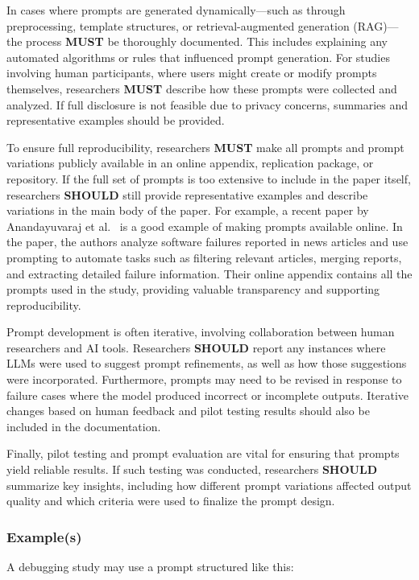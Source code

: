 \documentclass[11pt]{article}
\begin{document}
In cases where prompts are generated dynamically—such as through preprocessing, template structures, or retrieval-augmented generation (RAG)—the process \textbf{MUST} be thoroughly documented. This includes explaining any automated algorithms or rules that influenced prompt generation. For studies involving human participants, where users might create or modify prompts themselves, researchers \textbf{MUST} describe how these prompts were collected and analyzed. If full disclosure is not feasible due to privacy concerns, summaries and representative examples should be provided.

To ensure full reproducibility, researchers \textbf{MUST} make all prompts and prompt variations publicly available in an online appendix, replication package, or repository. If the full set of prompts is too extensive to include in the paper itself, researchers \textbf{SHOULD} still provide representative examples and describe variations in the main body of the paper. For example, a recent paper by Anandayuvaraj et al.~\cite{anandayuvaraj2024fail} is a good example of making prompts available online. In the paper, the authors analyze software failures reported in news articles and use prompting to automate tasks such as filtering relevant articles, merging reports, and extracting detailed failure information. Their online appendix contains all the prompts used in the study, providing valuable transparency and supporting reproducibility.

Prompt development is often iterative, involving collaboration between human researchers and AI tools. Researchers \textbf{SHOULD} report any instances where LLMs were used to suggest prompt refinements, as well as how those suggestions were incorporated. Furthermore, prompts may need to be revised in response to failure cases where the model produced incorrect or incomplete outputs. Iterative changes based on human feedback and pilot testing results should also be included in the documentation.

Finally, pilot testing and prompt evaluation are vital for ensuring that prompts yield reliable results. If such testing was conducted, researchers \textbf{SHOULD} summarize key insights, including how different prompt variations affected output quality and which criteria were used to finalize the prompt design.

\subsubsection{Example(s)}
A debugging study may use a prompt structured like this:
\end{document}
